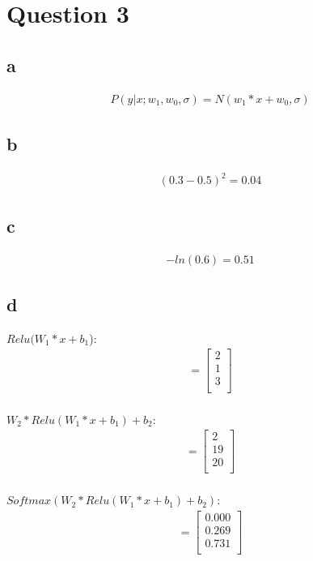 \documentclass[12pt]{article}
\begin{document}
\section{Question 3}
\subsection{a}
\begin{align*}
    P(y|x;w_1, w_0, \sigma) = N(w_1*x + w_0, \sigma)
\end{align*}

\subsection{b}
\begin{align*}
    (0.3-0.5)^2 = 0.04
\end{align*}

\subsection{c}
\begin{align*}
    -ln(0.6) = 0.51
\end{align*}

\subsection{d}

$Relu(W_1*x + b_1$):
\begin{align*}
    = \begin{bmatrix}
        2 \\
        1 \\
        3 \\
    \end{bmatrix} \\
\end{align*}

$W_2*Relu(W_1*x+b_1)+b_2$:
\begin{align*}
    = \begin{bmatrix}
        2  \\
        19 \\
        20 \\
    \end{bmatrix} \\
\end{align*}

$Softmax(W_2*Relu(W_1*x+b_1)+b_2)$:
\begin{align*}
    = \begin{bmatrix}
        0.000 \\
        0.269 \\
        0.731 \\
    \end{bmatrix} \\
\end{align*}
\end{document}
